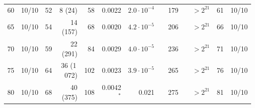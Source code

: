 \begin{table}[p]
\begin{tabular}{r r r r r r r r r r r r r}
60 & 10/10 & 52 & 8 (24) & 58 & 0.0022 & $2.0{\cdot}10^{-4}$ &  & 179 &  & $>2^{21}$ & 61 & 10/10\\
65 & 10/10 & 54 & 14 (157) & 68 & 0.0020 & $4.2{\cdot}10^{-5}$ &  & 206 &  & $>2^{21}$ & 66 & 10/10\\
70 & 10/10 & 59 & 22 (291) & 84 & 0.0029 & $4.0{\cdot}10^{-5}$ &  & 236 &  & $>2^{21}$ & 71 & 10/10\\
75 & 10/10 & 64 & 36 (1\,072) & 102 & 0.0023 & $3.9{\cdot}10^{-5}$ &  & 265 &  & $>2^{21}$ & 76 & 10/10\\
80 & 10/10 & 68 & 40 (375) & 108 & 0.0042$^{*}$ & 0.021 &  & 275 &  & $>2^{21}$ & 81 & 10/10\\
\bottomrule
\end{tabular}
\end{table}
